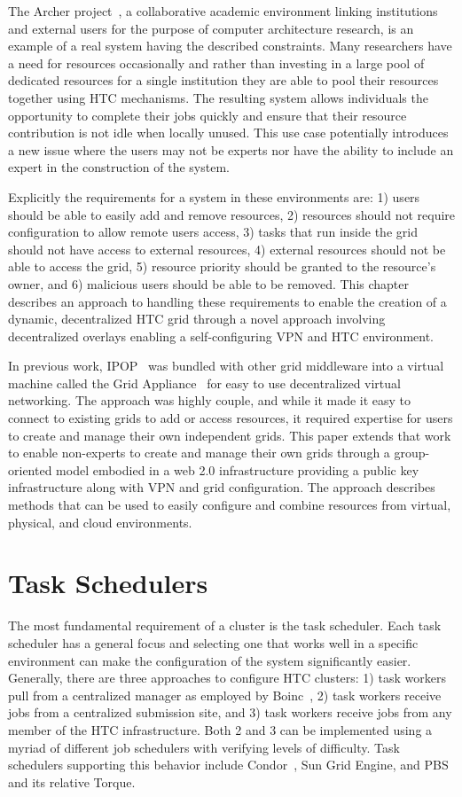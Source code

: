 The Archer project~\cite{archer}, a collaborative academic environment
linking institutions and external users for the purpose of computer architecture
research, is an example of a real system having the described constraints.  Many
researchers have a need for resources occasionally and rather than investing
in a large pool of dedicated resources for a single institution they are able
to pool their resources together using HTC mechanisms.  The resulting system
allows individuals the opportunity to complete their jobs quickly and ensure
that their resource contribution is not idle when locally unused.  This use
case potentially introduces a new issue where the users may not be experts nor
have the ability to include an expert in the construction of the system.

Explicitly the requirements for a system in these environments are: 1) users
should be able to easily add and remove resources, 2) resources should not
require configuration to allow remote users access, 3) tasks that run inside
the grid should not have access to external resources, 4) external resources
should not be able to access the grid, 5) resource priority should be granted
to the resource's owner, and 6) malicious users should be able to be removed.
This chapter describes an approach to handling these requirements to
enable the creation of a dynamic, decentralized HTC grid through a novel
approach involving decentralized overlays enabling a self-configuring VPN
and HTC environment.  

In previous work, IPOP~\cite{ipop} was bundled with other grid middleware
into a virtual machine called the Grid Appliance~\cite{grid_appliance} for
easy to use decentralized virtual networking.  The approach was highly couple,
and while it made it easy to connect to existing grids to add or access
resources, it required expertise for users to create and manage their own
independent grids.  This paper extends that work to enable non-experts to
create and manage their own grids through a group-oriented model embodied in a
web 2.0 infrastructure providing a public key infrastructure along with VPN and
grid configuration.  The approach describes methods that can be used to easily
configure and combine resources from virtual, physical, and cloud
environments.

\section{Task Schedulers}
The most fundamental requirement of a cluster is the task scheduler.  Each
task scheduler has a general focus and selecting one that works well in a
specific environment can make the configuration of the system significantly
easier.  Generally, there are three approaches to configure HTC clusters: 1)
task workers pull from a centralized manager as employed by Boinc~\cite{boinc},
2) task workers receive jobs from a centralized submission site, and 3) task
workers receive jobs from any member of the HTC infrastructure.  Both 2 and 3
can be implemented using a myriad of different job schedulers with verifying
levels of difficulty.  Task schedulers supporting this behavior include
Condor~\cite{condor0}, Sun Grid Engine, and PBS and its relative Torque.

